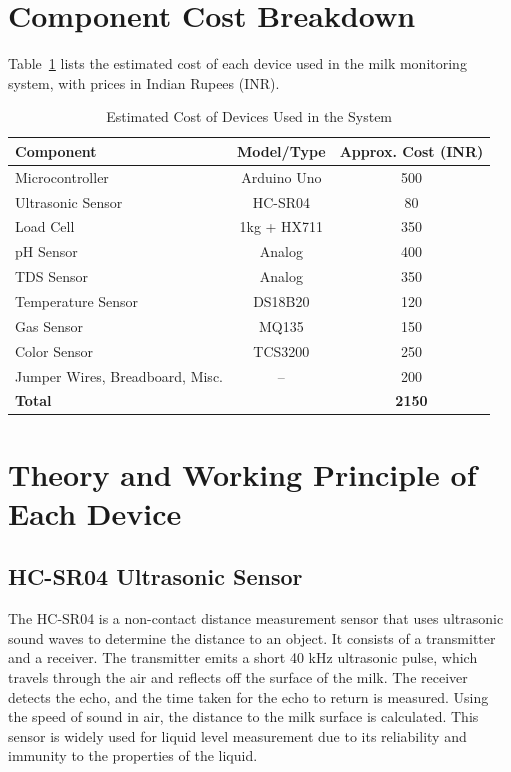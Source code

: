 \documentclass[12pt,a4paper]{article}
\begin{document}
\section{Component Cost Breakdown}

Table~\ref{tab:costs} lists the estimated cost of each device used in the milk monitoring system, with prices in Indian Rupees (INR).

\begin{table}[H]
\centering
\begin{tabular}{lcc}
\toprule
\textbf{Component} & \textbf{Model/Type} & \textbf{Approx. Cost (INR)} \\
\midrule
Microcontroller & Arduino Uno & 500 \\
Ultrasonic Sensor & HC-SR04 & 80 \\
Load Cell & 1kg + HX711 & 350 \\
pH Sensor & Analog & 400 \\
TDS Sensor & Analog & 350 \\
Temperature Sensor & DS18B20 & 120 \\
Gas Sensor & MQ135 & 150 \\
Color Sensor & TCS3200 & 250 \\
Jumper Wires, Breadboard, Misc. & -- & 200 \\
\midrule
\textbf{Total} & & \textbf{2150} \\
\bottomrule
\end{tabular}
\caption{Estimated Cost of Devices Used in the System}
\label{tab:costs}
\end{table}

\section{Theory and Working Principle of Each Device}

\subsection{HC-SR04 Ultrasonic Sensor}
The HC-SR04 is a non-contact distance measurement sensor that uses ultrasonic sound waves to determine the distance to an object. It consists of a transmitter and a receiver. The transmitter emits a short 40 kHz ultrasonic pulse, which travels through the air and reflects off the surface of the milk. The receiver detects the echo, and the time taken for the echo to return is measured. Using the speed of sound in air, the distance to the milk surface is calculated. This sensor is widely used for liquid level measurement due to its reliability and immunity to the properties of the liquid.
\end{document}
